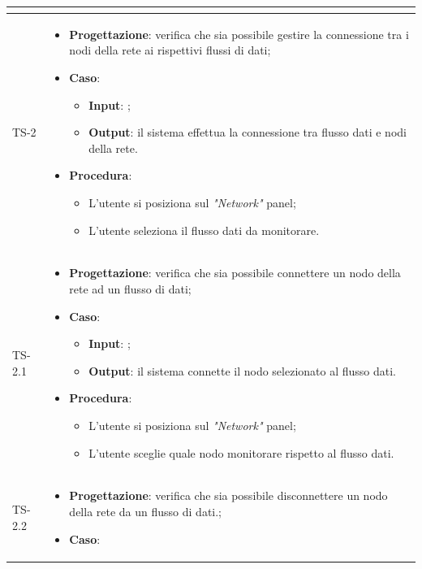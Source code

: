 \begin{longtable}{|C{2.5cm}|C{13cm}|}
\begin{itemize}
\begin{itemize}
	\end{itemize} 
\end{itemize}\\
	\hline
	{TS-2} & 
\begin{itemize}
	\item \textbf{Progettazione}: verifica che sia possibile gestire la
	connessione tra i nodi della rete ai rispettivi flussi di dati;
	\item \textbf{Caso}: 
	\begin{itemize}
		\item \textbf{Input}: ;
		\item \textbf{Output}: il sistema effettua la connessione tra flusso dati e nodi della rete.
	\end{itemize}
	\item \textbf{Procedura}:
	\begin{itemize}
		\item L'utente si posiziona sul \emph{"Network"} panel;
		\item L'utente seleziona il flusso dati da monitorare.
	\end{itemize} 
\end{itemize} \\
	\hline
	{TS-2.1} &
\begin{itemize}
	\item \textbf{Progettazione}: verifica che sia possibile connettere un
	nodo della rete ad un flusso di dati;
	\item \textbf{Caso}: 
	\begin{itemize}
		\item \textbf{Input}: ;
		\item \textbf{Output}: il sistema connette il nodo selezionato al flusso dati.
	\end{itemize}
	\item \textbf{Procedura}:
	\begin{itemize}
		\item L'utente si posiziona sul \emph{"Network"} panel;
		\item L'utente sceglie quale nodo monitorare rispetto al flusso dati.
	\end{itemize} 
\end{itemize}	
	 \\
	\hline
	{TS-2.2} &
\begin{itemize}
	\item \textbf{Progettazione}: verifica che sia possibile disconnettere un
	nodo della rete da un flusso di dati.;
	\item \textbf{Caso}: 

\end{itemize}
\end{longtable}
